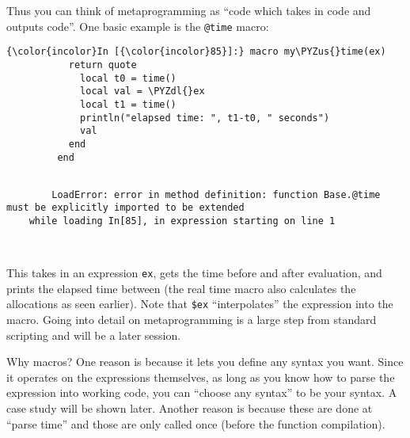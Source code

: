 \documentclass[11pt]{article}
\def\PYZus{\char`\_}
\def\PYZdl{\char`\$}
\begin{document}
Thus you can think of metaprogramming as ``code which takes in code and
outputs code''. One basic example is the \texttt{@time} macro:

    \begin{Verbatim}[commandchars=\\\{\}]
{\color{incolor}In [{\color{incolor}85}]:} macro my\PYZus{}time(ex)
           return quote
             local t0 = time()
             local val = \PYZdl{}ex
             local t1 = time()
             println("elapsed time: ", t1-t0, " seconds")
             val
           end
         end
\end{Verbatim}

    \begin{Verbatim}[commandchars=\\\{\}]

        LoadError: error in method definition: function Base.@time must be explicitly imported to be extended
    while loading In[85], in expression starting on line 1

        

    \end{Verbatim}

    This takes in an expression \texttt{ex}, gets the time before and after
evaluation, and prints the elapsed time between (the real time macro
also calculates the allocations as seen earlier). Note that
\texttt{\$ex} ``interpolates'' the expression into the macro. Going into
detail on metaprogramming is a large step from standard scripting and
will be a later session.

Why macros? One reason is because it lets you define any syntax you
want. Since it operates on the expressions themselves, as long as you
know how to parse the expression into working code, you can ``choose any
syntax'' to be your syntax. A case study will be shown later. Another
reason is because these are done at ``parse time'' and those are only
called once (before the function compilation).


    
    
    
    
\end{document}
